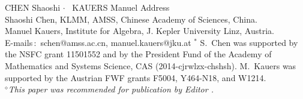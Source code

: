 \documentclass{jssc}
\def\cdd{\mbox{\boldmath$\cdot$}~}
\begin{document}
{ \uppercase{Chen} Shaoshi  \cdd
\uppercase{Kauers} Manuel}%
{Address\\ Shaoshi Chen, KLMM, AMSS, Chinese Academy of Sciences, China.\\
Manuel Kauers, Institute for Algebra, J. Kepler University Linz, Austria.\\
    E-mails\,$:$ schen@amss.ac.cn, manuel.kauers@jku.at} %
{$^*$ S.\ Chen was supported by the NSFC grant 11501552 and
   by the President Fund of the Academy of Mathematics and Systems Science, CAS (2014-cjrwlzx-chshsh).
   M.\ Kauers was supported by the Austrian FWF grants F5004, Y464-N18, and W1214.\\
{$^\diamond${\it This paper was recommended for publication by
Editor . }}}


\end{document}
